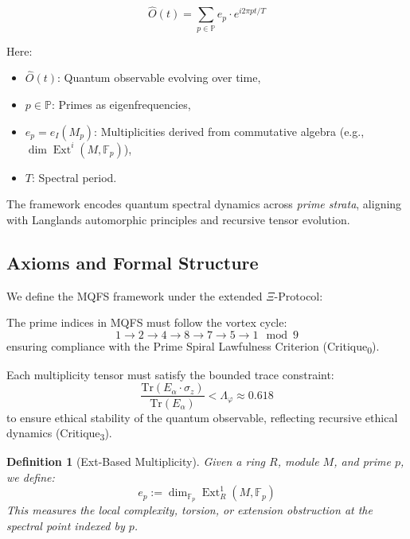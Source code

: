 \documentclass[12]{amsart}
\theoremstyle{plain}
\newtheorem{definition}[theorem]{Definition}
\begin{document}
\begin{equation}
\hat{O}(t) = \sum_{p \in \mathbb{P}} e_p \cdot e^{i 2\pi p t / T}
\end{equation}

Here:
\begin{itemize}
  \item \( \hat{O}(t) \): Quantum observable evolving over time,
  \item \( p \in \mathbb{P} \): Primes as eigenfrequencies,
  \item \( e_p = e_I(M_p) \): Multiplicities derived from commutative algebra (e.g., \( \dim \operatorname{Ext}^i(M, \mathbb{F}_p) \)),
  \item \( T \): Spectral period.
\end{itemize}

The framework encodes quantum spectral dynamics across \emph{prime strata}, aligning with Langlands automorphic principles and recursive tensor evolution.

\subsection{Axioms and Formal Structure}

We define the MQFS framework under the extended $\Xi$-Protocol:

\begin{axiom}
The prime indices in MQFS must follow the vortex cycle:
\[
1 \rightarrow 2 \rightarrow 4 \rightarrow 8 \rightarrow 7 \rightarrow 5 \rightarrow 1 \mod 9
\]
ensuring compliance with the Prime Spiral Lawfulness Criterion (Critique\textsubscript{0}).
\end{axiom}

\begin{axiom}
Each multiplicity tensor must satisfy the bounded trace constraint:
\[
\frac{\mathrm{Tr}(E_\alpha \cdot \sigma_z)}{\mathrm{Tr}(E_\alpha)} < \Lambda_\varphi \approx 0.618
\]
to ensure ethical stability of the quantum observable, reflecting recursive ethical dynamics (Critique\textsubscript{3}).
\end{axiom}

\begin{definition}[Ext-Based Multiplicity]
Given a ring \( R \), module \( M \), and prime \( p \), we define:
\[
e_p := \dim_{\mathbb{F}_p} \operatorname{Ext}^1_R(M, \mathbb{F}_p)
\]
This measures the local complexity, torsion, or extension obstruction at the spectral point indexed by \( p \).
\end{definition}
\end{document}
